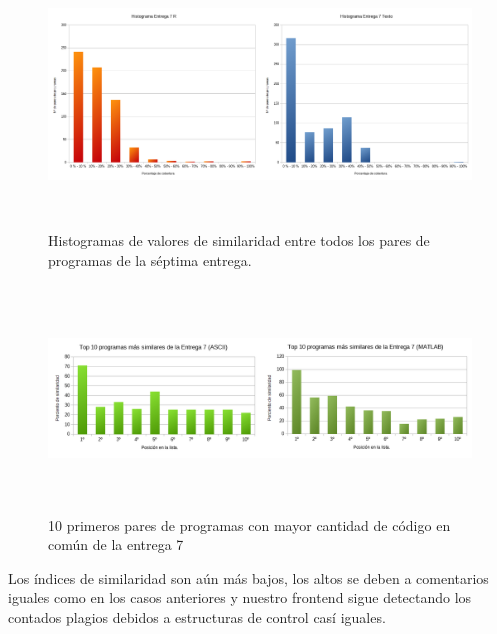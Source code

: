 \begin{figure}[H] %
\centering
\includegraphics[width=15cm, height=7cm]{imagenes/histograma7.png}  %
\caption{Histogramas de valores de similaridad entre todos los pares de programas de la séptima entrega.} \label{fig:histograma7}
\end{figure}




\begin{figure}[H] %
\centering
\includegraphics[width=14cm, height=6cm]{imagenes/TOP10_7.png}  %
\caption{10 primeros pares de programas con mayor cantidad de código en común de la entrega 7} \label{fig:TOP10_7}
\end{figure}


Los índices de similaridad son aún más bajos, los altos se deben a comentarios iguales como en los casos anteriores y nuestro frontend sigue detectando los contados plagios debidos a estructuras de control casí iguales.
\newline
\bigskip

